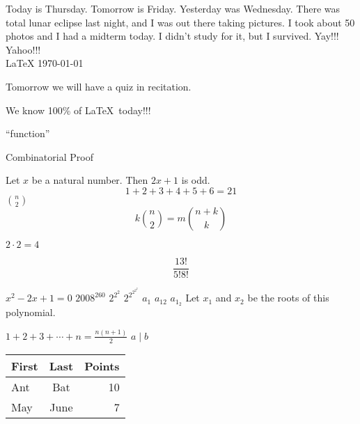 \documentclass[12pt]{article} %
\begin{document}
Today is Thursday.  Tomorrow is Friday.  Yesterday was Wednesday.  There was total lunar eclipse last night, and I was out there taking pictures.  I took about 50 photos and I had a midterm today.  I didn't study for it, but I survived.  Yay!!!\\
Yahoo!!!\\ %
\LaTeX %
\today %

Tomorrow we will have a quiz in recitation.

We know 100\% of \LaTeX\ today!!! %

``function'' %

\begin{center}
Combinatorial Proof
\end{center}

Let $x$ be a natural number.  Then $2x+1$ is odd.  \[1+2+3+4+5+6=21\]  $n \choose 2$
\[k {n\choose 2}=m {n+k\choose k}\] %

$2\cdot 2=4$

\[\frac{13!}{5!8!}\]

$x^2-2x+1=0$ $2008^{260}$ $2^{2^2}$ $2^{2^{2^{2^2}}}$ $a_1$ $a_{12}$ $a_{1_2}$  Let $x_1$ and $x_2$ be the roots of this polynomial.

$1+2+3+\cdots+n=\frac{n(n+1)}{2}$ $a\mid b$

\begin{tabular}{lc|r} %
First & Last & Points\\
\hline
Ant & Bat & 10\\
May & June & 7
\end{tabular}
\end{document}

